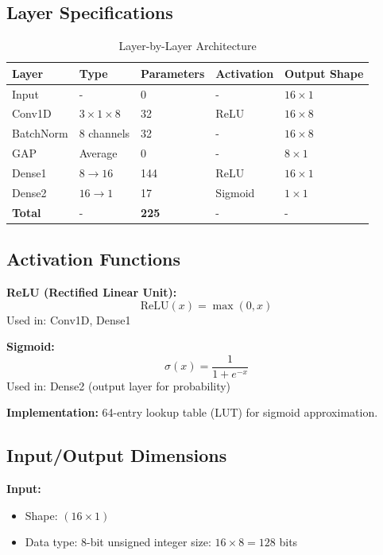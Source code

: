 \documentclass[11pt, a4paper]{article}
\begin{document}
\subsection{Layer Specifications}

\begin{table}[H]
\centering
\caption{Layer-by-Layer Architecture}
\label{tab:layers}
\begin{tabular}{@{}lllll@{}}
\toprule
\textbf{Layer} & \textbf{Type} & \textbf{Parameters} & \textbf{Activation} & \textbf{Output Shape} \\ \midrule
Input & - & 0 & - & $16 \times 1$ \\
Conv1D & $3 \times 1 \times 8$ & 32 & ReLU & $16 \times 8$ \\
BatchNorm & 8 channels & 32 & - & $16 \times 8$ \\
GAP & Average & 0 & - & $8 \times 1$ \\
Dense1 & $8 \to 16$ & 144 & ReLU & $16 \times 1$ \\
Dense2 & $16 \to 1$ & 17 & Sigmoid & $1 \times 1$ \\ \midrule
\textbf{Total} & - & \textbf{225} & - & - \\ \bottomrule
\end{tabular}
\end{table}

\subsection{Activation Functions}

\textbf{ReLU (Rectified Linear Unit):}
\begin{equation}
\text{ReLU}(x) = \max(0, x)
\end{equation}
Used in: Conv1D, Dense1

\textbf{Sigmoid:}
\begin{equation}
\sigma(x) = \frac{1}{1 + e^{-x}}
\end{equation}
Used in: Dense2 (output layer for probability)

\textbf{Implementation:} 64-entry lookup table (LUT) for sigmoid approximation.

\subsection{Input/Output Dimensions}

\textbf{Input:}
\begin{itemize}
    \item Shape: $(16 \times 1)$
    \item Data type: 8-bit unsigned integer
    \bit size: $16 \times 8 = 128$ bits
\end{itemize}
\end{document}
